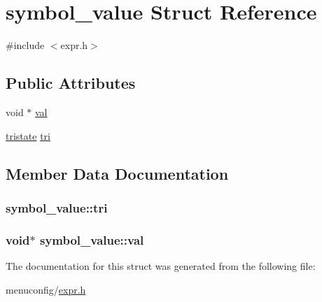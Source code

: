 \hypertarget{structsymbol__value}{\section{symbol\-\_\-value Struct Reference}
\label{structsymbol__value}
}


{\ttfamily \#include $<$expr.\-h$>$}

\subsection*{Public Attributes}
\begin{DoxyCompactItemize}
\item 
void $\ast$ \hyperlink{structsymbol__value_a6058000514a9750686806666b92b126c}{val}
\item 
\hyperlink{expr_8h_af4926743b1e532e0b2ad24161ff942a3}{tristate} \hyperlink{structsymbol__value_a10f3c60bb490fdde35f5c2055211e745}{tri}
\end{DoxyCompactItemize}


\subsection{Member Data Documentation}
\hypertarget{structsymbol__value_a10f3c60bb490fdde35f5c2055211e745}{
\subsubsection[{tri}]{ symbol\-\_\-value\-::tri}}\label{structsymbol__value_a10f3c60bb490fdde35f5c2055211e745}
\hypertarget{structsymbol__value_a6058000514a9750686806666b92b126c}{
\subsubsection[{val}]{\setlength{\rightskip}{0pt plus 5cm}void$\ast$ symbol\-\_\-value\-::val}}\label{structsymbol__value_a6058000514a9750686806666b92b126c}


The documentation for this struct was generated from the following file\-:\begin{DoxyCompactItemize}
\item 
menuconfig/\hyperlink{expr_8h}{expr.\-h}\end{DoxyCompactItemize}
